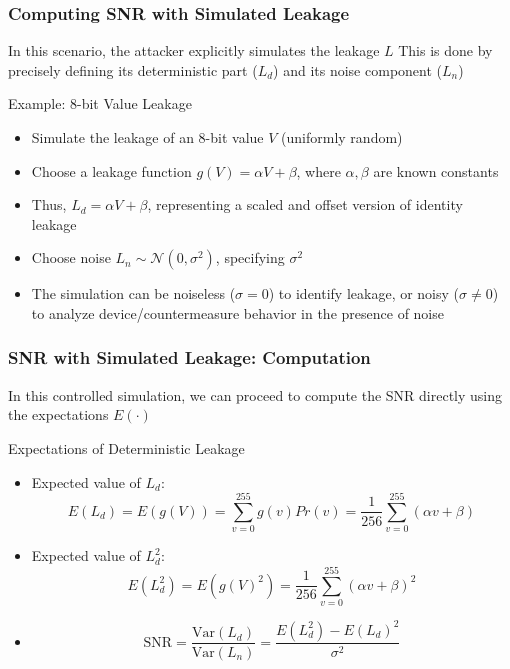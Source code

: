 \begin{frame}
    \frametitle{Computing SNR with Simulated Leakage}
    
            In this scenario, the attacker explicitly simulates the leakage $L$ \newline
            This is done by precisely defining its deterministic part ($L_d$) and its noise component ($L_n$)
   

    \begin{block}{Example: 8-bit Value Leakage}
        \begin{itemize}
            \item Simulate the leakage of an 8-bit value $V$ (uniformly random)
            \item Choose a leakage function $g(V) = \alpha V + \beta$, where $\alpha, \beta$ are known constants
            \item Thus, $L_d = \alpha V + \beta$, representing a scaled and offset version of identity leakage
            \item Choose noise $L_n \sim \mathcal{N}(0, \sigma^2)$, specifying $\sigma^2$
            \item The simulation can be noiseless ($\sigma = 0$) to identify leakage, or noisy ($\sigma \ne 0$) to analyze device/countermeasure behavior in the presence of noise
        \end{itemize}
    \end{block}
\end{frame}

\begin{frame}
    \frametitle{SNR with Simulated Leakage: Computation}
    
            In this controlled simulation, we can proceed to compute the SNR directly using the expectations $E(\cdot)$
       

    \begin{block}{Expectations of Deterministic Leakage}
        \begin{itemize}
            \item Expected value of $L_d$:
            $$ E(L_d) = E(g(V)) = \sum_{v=0}^{255} g(v)Pr(v) = \frac{1}{256} \sum_{v=0}^{255} (\alpha v + \beta) $$
            \item Expected value of $L_d^2$:
            $$ E(L_d^2) = E(g(V)^2) = \frac{1}{256} \sum_{v=0}^{255} (\alpha v + \beta)^2 $$
            \item $$ \text{SNR} = \frac{\text{Var}(L_d)}{\text{Var}(L_n)} = \frac{E(L_d^2) - E(L_d)^2}{\sigma^2} $$

        \end{itemize}
    \end{block}
\end{frame}

